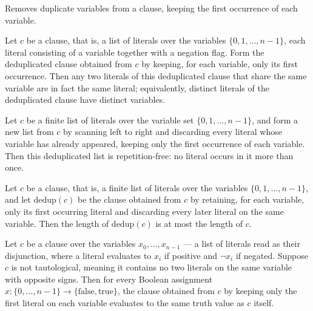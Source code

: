 \begin{definition}
\label{LMN.dedupClauseVars}
\leanok
{}
Removes duplicate variables from a clause, keeping the first occurrence of each
variable.
\end{definition}

\begin{lemma}
\label{LMN.dedupClauseVars_var_inj}
\leanok
{}
Let $c$ be a clause, that is, a list of literals over the variables $\{0,1,\dots,n-1\}$,
each literal consisting of a variable together with a negation flag. Form the
deduplicated clause obtained from $c$ by keeping, for each variable, only its first
occurrence. Then any two literals of this deduplicated clause that share the same
variable are in fact the same literal; equivalently, distinct literals of the
deduplicated clause have distinct variables.
\end{lemma}

\begin{lemma}
\label{LMN.dedupClauseVars_nodup}
\leanok
{}
Let $c$ be a finite list of literals over the variable set $\{0,1,\dots,n-1\}$, and form
a new list from $c$ by scanning left to right and discarding every literal whose
variable has already appeared, keeping only the first occurrence of each variable. Then
this deduplicated list is repetition-free: no literal occurs in it more than once.
\end{lemma}

\begin{lemma}
\label{LMN.dedupClauseVars_length_le}
\leanok
{}
Let $c$ be a clause, that is, a finite list of literals over the variables
$\{0,1,\dots,n-1\}$, and let $\mathrm{dedup}(c)$ be the clause obtained from $c$ by
retaining, for each variable, only its first occurring literal and discarding every
later literal on the same variable. Then the length of $\mathrm{dedup}(c)$ is at most
the length of $c$.
\end{lemma}

\begin{lemma}
\label{LMN.dedupClauseVars_eval_of_not_taut}
\leanok
{}
Let $c$ be a clause over the variables $x_0,\dots,x_{n-1}$ — a list of literals read as
their disjunction, where a literal evaluates to $x_i$ if positive and $\lnot x_i$ if
negated. Suppose $c$ is not tautological, meaning it contains no two literals on the
same variable with opposite signs. Then for every Boolean assignment $x \colon
\{0,\dots,n-1\} \to \{\mathrm{false},\mathrm{true}\}$, the clause obtained from $c$ by
keeping only the first literal on each variable evaluates to the same truth value as $c$
itself.
\end{lemma}

